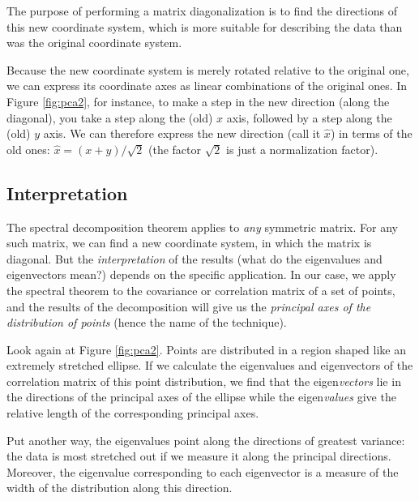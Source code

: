 The purpose of performing a matrix diagonalization is to find the
directions of this new coordinate system, which is more suitable for
describing the data than was the original coordinate system.

Because the new coordinate system is merely rotated relative to the
original one, we can express its coordinate axes as linear
combinations of the original ones. In Figure \ref{fig:pca2}, for
instance, to make a step in the new direction (along the diagonal), you
take a step along the (old) $x$ axis,\vadjust{\pagebreak} followed by a step along the
(old) $y$ axis. We can therefore express the new direction (call it
$\hat{x}$) in terms of the old ones: $\hat{x} = (x + y)/\sqrt{2}$ (the
factor $\sqrt{2}$ is just a normalization factor).


\subsection{Interpretation}

 
The spectral decomposition theorem applies to \emph{any} symmetric
matrix. For any such matrix, we can find a new coordinate system, in
which the matrix is diagonal. But the \emph{interpretation} of the
results (what do the eigenvalues and eigenvectors mean?) depends on
the specific application.  In our case, we apply the spectral theorem
to the covariance or correlation matrix of a set of points, and the
results of the decomposition will give us the \emph{principal axes of
  the distribution of points} (hence the name of the technique).

Look again at Figure \ref{fig:pca2}. Points are distributed in a
region shaped like an extremely stretched ellipse. If we calculate the
eigenvalues and eigenvectors of the correlation matrix of this point
distribution, we find that the eigen\emph{vectors} 
lie in the directions of the principal axes
of the ellipse while the eigen\emph{values} give the relative length of
the corresponding principal axes.

Put another way, the eigenvalues point along the directions of
greatest variance: the data is most stretched out if we measure it
along the principal directions. Moreover, the eigenvalue corresponding
to each eigenvector is a measure of the width of the distribution along
this direction. 

